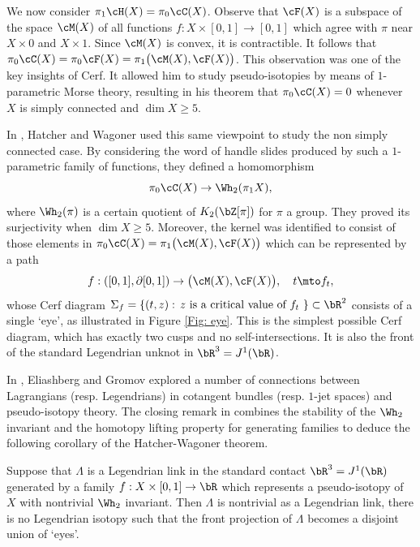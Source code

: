 We now consider $\pi_1\cH(X) = \pi_0 \cC(X)$. Observe that $\cF(X)$ is a subspace of the space $\cM(X)$ of all functions $f:X \times [0,1] \to [0,1]$ which agree with $\pi$ near $X \times 0$ and $X \times 1$. Since $\cM(X)$ is convex, it is contractible. It follows that $\pi_0 \cC(X) = \pi_0 \cF(X) = \pi_1 \big( \cM(X), \cF(X) \big)$. This observation was one of the key insights of Cerf. It allowed him to study pseudo-isotopies by means of $1$-parametric Morse theory, resulting in his theorem \cite{C70} that $\pi_0 \cC(X) =0$ whenever $X$ is simply connected and $\dim X \geq 5$.

In \cite{HW73}, Hatcher and Wagoner used this same viewpoint to study the non simply connected case. By considering the word of handle slides produced by such a $1$-parametric family of functions, they defined a homomorphism
\[ \pi_0 \cC(X) \to \Wh_2(\pi_1X ), \]
where $\Wh_2(\pi)$ is a certain quotient of $K_2( \bZ[\pi])$ for $\pi$ a group. They proved its surjectivity when $\dim X \geq 5$. Moreover, the kernel was identified to consist of those elements in $\pi_0 \cC(X) = \pi_1 \big( \cM(X), \cF(X) \big)$ which can be represented by a path
\[ f: ([0,1],\partial [0,1]) \to \big(\cM(X), \cF(X)\big), \quad t \mto f_t,\]
whose Cerf diagram $\Sigma_f = \{ (t,z) : \, \text{$z$ is a critical value of $f_t$ } \} \subset \bR^2$ consists of a single `eye', as illustrated in Figure \ref{Fig: eye}. This is the simplest possible Cerf diagram, which has exactly two cusps and no self-intersections. It is also the front of the standard Legendrian unknot in $\bR^3=J^1(\bR)$.

In \cite{EG98}, Eliashberg and Gromov explored a number of connections between Lagrangians (resp. Legendrians) in cotangent bundles (resp. $1$-jet spaces) and pseudo-isotopy theory. The closing remark in \cite{EG98} combines the stability of the $\Wh_2$ invariant and the homotopy lifting property for generating families to deduce the following corollary of the Hatcher-Wagoner theorem.

\begin{theorem}\label{Theorem: wh1} Suppose that $\Lambda$ is a Legendrian link in the standard contact $\bR^3=J^1(\bR)$ generated by a family $f:X \times [0,1] \to \bR$ which represents a pseudo-isotopy of $X$ with nontrivial $\Wh_2$ invariant. Then $\Lambda$ is nontrivial as a Legendrian link, \ie there is no Legendrian isotopy such that the front projection of $\Lambda$ becomes a disjoint union of `eyes'. \end{theorem}

